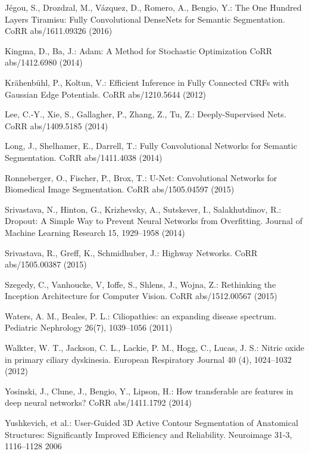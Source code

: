 \documentclass{llncs}
\begin{document}
\begin{thebibliography}{23}
J{\'{e}}gou, S., Drozdzal, M., V{\'{a}}zquez, D., Romero, A., Bengio, Y.:
The One Hundred Layers Tiramisu: Fully Convolutional DenseNets for Semantic Segmentation.
CoRR abs/1611.09326 (2016)

Kingma, D., Ba, J.:
Adam: {A} Method for Stochastic Optimization
CoRR abs/1412.6980 (2014)

Kr{\"{a}}henb{\"{u}}hl, P., Koltun, V.:
Efficient Inference in Fully Connected CRFs with Gaussian Edge Potentials.
CoRR abs/1210.5644 (2012)

Lee, C.-Y., Xie, S., Gallagher, P., Zhang, Z., Tu, Z.:
Deeply-Supervised Nets.
CoRR abs/1409.5185 (2014)

Long, J., Shelhamer, E., Darrell, T.:
Fully Convolutional Networks for Semantic Segmentation.
CoRR abs/1411.4038 (2014)

Ronneberger, O., Fischer, P., Brox, T.:
U-Net: Convolutional Networks for Biomedical Image Segmentation.
CoRR abs/1505.04597 (2015)

Srivastava, N., Hinton, G., Krizhevsky, A., Sutskever, I., Salakhutdinov, R.:
Dropout: A Simple Way to Prevent Neural Networks from Overfitting.
Journal of Machine Learning Research 15, 1929--1958 (2014)

Srivastava, R., Greff, K., Schmidhuber, J.:
Highway Networks.
CoRR abs/1505.00387 (2015)

Szegedy, C., Vanhoucke, V, Ioffe, S., Shlens, J., Wojna, Z.:
Rethinking the Inception Architecture for Computer Vision.
CoRR abs/1512.00567 (2015)

Waters, A. M., Beales, P. L.:
Ciliopathies: an expanding disease spectrum.
Pediatric Nephrology 26(7), 1039--1056 (2011)

Walkter, W. T., Jackson, C. L., Lackie, P. M., Hogg, C., Lucas, J. S.:
Nitric oxide in primary ciliary dyskinesia.
European Respiratory Journal 40 (4), 1024--1032 (2012)

Yosinski, J., Clune, J., Bengio, Y., Lipson, H.:
How transferable are features in deep neural networks?
CoRR abs/1411.1792  (2014)

Yushkevich, et al.:
User-Guided {3D} Active Contour Segmentation of Anatomical Structures: Significantly Improved Efficiency and Reliability.
Neuroimage 31-3, 1116--1128 2006

\end{thebibliography}


\clearpage
{} %
\renewcommand{\indexname}{Author Index}
\printindex
\clearpage
\end{document}
